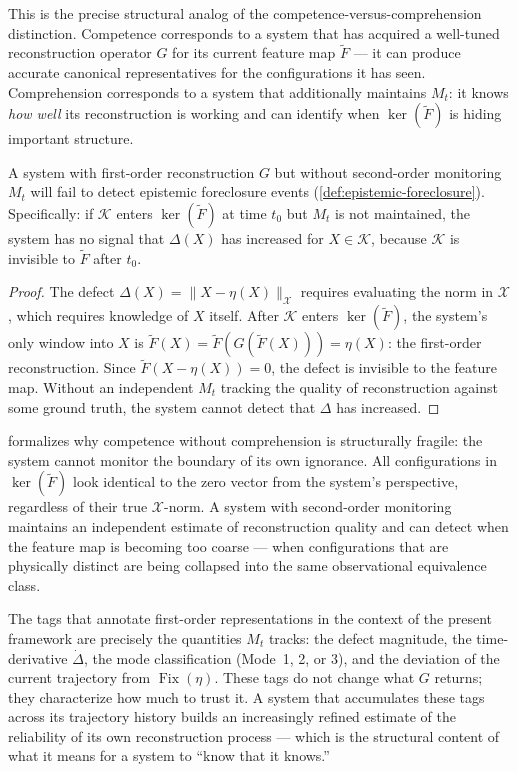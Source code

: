 \documentclass[12pt, oneside]{memoir}
\DeclareMathOperator{\Fix}{Fix}
\newcommand{\X}{\mathcal{X}}
\newcommand{\Ft}{\widetilde{F}}
\newcommand{\nnorm}[1]{\lVert #1 \rVert}
\begin{document}
This is the precise structural analog of the competence-versus-comprehension distinction.
Competence corresponds to a system that has acquired a well-tuned reconstruction operator
$G$ for its current feature map $\Ft$ — it can produce accurate canonical
representatives for the configurations it has seen.  Comprehension corresponds to a
system that additionally maintains $M_t$: it knows \emph{how well} its reconstruction is
working and can identify when $\ker(\Ft)$ is hiding important structure.

\begin{proposition}
\label{prop:comp-without-comp}
A system with first-order reconstruction $G$ but without second-order monitoring $M_t$
will fail to detect epistemic foreclosure events (\cref{def:epistemic-foreclosure}).
Specifically: if $\mathcal{K}$ enters $\ker(\Ft)$ at time $t_0$ but $M_t$ is not
maintained, the system has no signal that $\Delta(X)$ has increased for
$X \in \mathcal{K}$, because $\mathcal{K}$ is invisible to $\Ft$ after $t_0$.
\end{proposition}

\begin{proof}
The defect $\Delta(X) = \nnorm{X - \eta(X)}_\X$ requires evaluating the norm in $\X$,
which requires knowledge of $X$ itself.  After $\mathcal{K}$ enters $\ker(\Ft)$, the
system's only window into $X$ is $\Ft(X) = \Ft(G(\Ft(X))) = \eta(X)$: the first-order
reconstruction.  Since $\Ft(X - \eta(X)) = 0$, the defect is invisible to the feature
map.  Without an independent $M_t$ tracking the quality of reconstruction against some
ground truth, the system cannot detect that $\Delta$ has increased.
\end{proof}

 formalizes why competence without comprehension is
structurally fragile: the system cannot monitor the boundary of its own ignorance.  All
configurations in $\ker(\Ft)$ look identical to the zero vector from the system's
perspective, regardless of their true $\X$-norm.  A system with second-order monitoring
maintains an independent estimate of reconstruction quality and can detect when the
feature map is becoming too coarse — when configurations that are physically distinct
are being collapsed into the same observational equivalence class.

The tags that annotate first-order representations in the context of the present
framework are precisely the quantities $M_t$ tracks: the defect magnitude, the
time-derivative $\dot\Delta$, the mode classification (Mode~1, 2, or 3), and the
deviation of the current trajectory from $\Fix(\eta)$.  These tags do not change what
$G$ returns; they characterize how much to trust it.  A system that accumulates these
tags across its trajectory history builds an increasingly refined estimate of the
reliability of its own reconstruction process — which is the structural content of what
it means for a system to ``know that it knows.''
\end{document}
